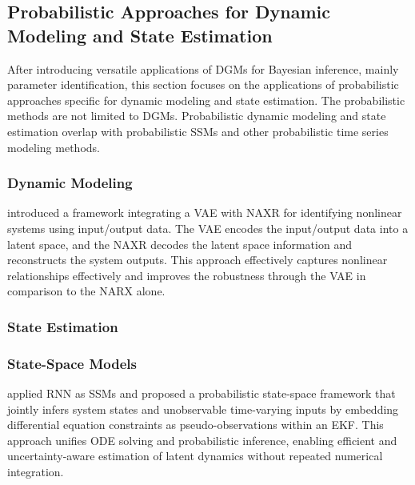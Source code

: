 \subsection{Probabilistic Approaches for Dynamic Modeling and State Estimation}

After introducing versatile applications of \acp{DGM} for Bayesian inference, mainly parameter identification, this section focuses on the applications of probabilistic approaches specific for dynamic modeling and state estimation. The probabilistic methods are not limited to \acp{DGM}. Probabilistic dynamic modeling and state estimation overlap with probabilistic \acp{SSM} and other probabilistic time series modeling methods. 
\subsubsection{Dynamic Modeling}
\citeauthor{PANIAGUA2024200344}\citeyearpar{PANIAGUA2024200344} introduced a framework integrating a \ac{VAE} with \ac{NAXR} for identifying nonlinear systems using input/output data. The \ac{VAE} encodes the input/output data into a latent space, and the \ac{NAXR} decodes the latent space information and reconstructs the system outputs. This approach effectively captures nonlinear relationships effectively and improves the robustness through the \ac{VAE} in comparison to the \ac{NARX} alone.
\subsubsection{State Estimation}
\subsubsection{State-Space Models}
\citeauthor{doerr2018prssm} \citeyearpar{doerr2018prssm} applied \ac{RNN} as \acp{SSM} and \citeauthor{NEURIPS2021_6734fa70} \citeyearpar{NEURIPS2021_6734fa70} proposed a probabilistic state-space framework that jointly infers system states and unobservable time-varying inputs by embedding differential equation constraints as pseudo-observations within an \ac{EKF}. This approach unifies ODE solving and probabilistic inference, enabling efficient and uncertainty-aware estimation of latent dynamics without repeated numerical integration.


